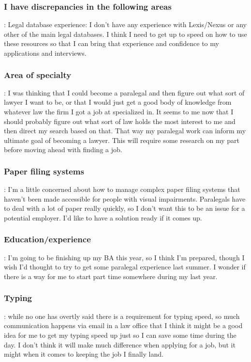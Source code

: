 \subsubsection*{I have discrepancies in the following areas}: Legal database experience: I don't have any experience with Lexis/Nexus or any other of the main legal databases. I think I need to get up to speed on how to use these resources so that I can bring that experience and confidence to my applications and interviews.

\subsubsection*{Area of specialty}: I was thinking that I could become a paralegal and then figure out what sort of lawyer I want to be, or that I would just get a good body of knowledge from whatever law the firm I got a job at specialized in. It seems to me now that I should probably figure out what sort of law holds the most interest to me and then direct my search based on that. That way my paralegal work can inform my ultimate goal of becoming a lawyer. This will require some research on my part before moving ahead with finding a job.

\subsubsection*{Paper filing systems}: I'm a little concerned about how to manage complex paper filing systems that haven't been made accessible for people with visual impairments. Paralegals have to deal with a lot of paper really quickly, so I don't want this to be an issue for a potential employer. I'd like to have a solution ready if it comes up.

\subsubsection*{Education/experience}: I'm going to be finishing up my BA this year, so I think I'm prepared, though I wish I'd thought to try to get some paralegal experience last summer. I wonder if there is a way for me to start part time somewhere during my last year.

\subsubsection*{Typing}: while no one has overtly said there is a requirement for typing speed, so much communication happens via email in a law office that I think it might be a good idea for me to get my typing speed up just so I can save some time during the day. I don't think it will make much difference when applying for a job, but it might when it comes to keeping the job I finally land.


